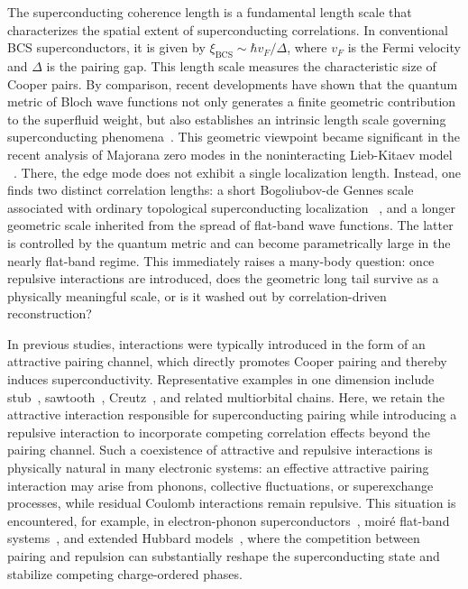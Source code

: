 \documentclass[
  prb,
  reprint,
  superscriptaddress,
  amsmath,
  amssymb,
  longbibliography
]{revtex4-2}
\begin{document}
The superconducting coherence length is a fundamental length scale that characterizes the spatial extent of superconducting correlations. In conventional BCS superconductors, it is given by \(\xi_{\mathrm{BCS}}\sim \hbar v_F/\Delta\), where \(v_F\) is the Fermi velocity and \(\Delta\) is the pairing gap. This length scale measures the characteristic size of Cooper pairs. By comparison, recent developments have shown that the quantum metric of Bloch wave functions not only generates a finite geometric contribution to the superfluid weight, but also establishes an intrinsic length scale governing superconducting phenomena~\cite{chenGinzburgLandauTheoryFlat2024,huAnomalousCoherenceLength2025,yangQuantumGeometricKondo2026}. This geometric viewpoint became significant in the recent analysis of Majorana zero modes in the noninteracting Lieb-Kitaev model ~\cite{guoMajoranaZeroModes2025}. There, the edge mode does not exhibit a single localization length. Instead, one finds two distinct correlation lengths: a short Bogoliubov-de Gennes scale associated with ordinary topological superconducting localization ~\cite{kitaevUnpairedMajoranaFermions2001,miaoMajoranaZeroModes2018}, and a longer geometric scale inherited from the spread of flat-band wave functions. The latter is controlled by the quantum metric and can become parametrically large in the nearly flat-band regime. This immediately raises a  many-body question: once repulsive interactions are introduced, does the geometric long tail survive as a physically meaningful scale, or is it washed out by correlation-driven reconstruction?

In previous studies, interactions were typically introduced in the form of an attractive pairing channel, which directly promotes Cooper pairing and thereby induces superconductivity.
Representative examples in one dimension include stub~\cite{thuminFlatBandSuperconductivity2023}, sawtooth~\cite{chanPairingSuperconductivityQuasi2022}, Creutz~\cite{chanPairingSuperconductivityQuasi2022,mondainiPairingSuperconductivityFlat2018,tovmasyanEffectiveTheoryEmergent2016a,salernoDrudeWeightManybody2023}, and related multiorbital chains. Here, we retain the attractive interaction responsible for superconducting pairing while introducing a repulsive interaction to incorporate competing correlation effects beyond the pairing channel. Such a coexistence of attractive and repulsive interactions is physically natural in many electronic systems: an effective attractive pairing interaction may arise from phonons, collective fluctuations, or superexchange processes, while residual Coulomb interactions remain repulsive. This situation is encountered, for example, in electron-phonon superconductors~\cite{morelCalculationSuperconductingState1962,sacepeQuantumBreakdownSuperconductivity2020}, moiré flat-band systems~\cite{wuTheoryPhononMediatedSuperconductivity2018,lianTwistedBilayerGraphene2019}, and extended Hubbard models~\cite{pencPhaseDiagramOnedimensional1994,aligiaPhaseDiagramOnedimensional2000}, where the competition between pairing and repulsion can substantially reshape the superconducting state and stabilize competing charge-ordered phases.
\end{document}
